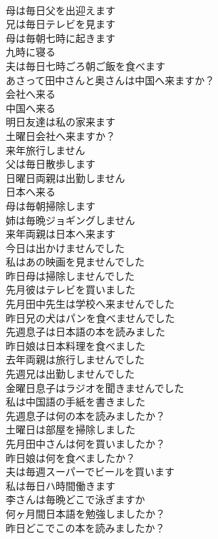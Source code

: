 \documentclass[8pt]{extreport}
\begin{document}
\begin{CJK}{UTF8}{min}
\\	母は毎日父を出迎えます	
\\	兄は毎日テレビを見ます	
\\	母は毎朝七時に起きます	
\\	九時に寝る	
\\	夫は毎日七時ごろ朝ご飯を食べます	
\\	あさって田中さんと奥さんは中国へ来ますか？	
\\	会社へ来る	
\\	中国へ来る	
\\	明日友達は私の家来ます	
\\	土曜日会社へ来ますか？	
\\	来年旅行しません	
\\	父は毎日散歩します	
\\	日曜日両親は出勤しません	
\\	日本へ来る	
\\	母は毎朝掃除します	
\\	姉は毎晩ジョギングしません	
\\	来年両親は日本へ来ます	
\\	今日は出かけませんでした	
\\	私はあの映画を見ませんでした	
\\	昨日母は掃除しませんでした	
\\	先月彼はテレビを買いました	
\\	先月田中先生は学校へ来ませんでした	
\\	昨日兄の犬はパンを食べませんでした	
\\	先週息子は日本語の本を読みました	
\\	昨日娘は日本料理を食べました	
\\	去年両親は旅行しませんでした	
\\	先週兄は出勤しませんでした	
\\	金曜日息子はラジオを聞きませんでした	
\\	私は中国語の手紙を書きました	
\\	先週息子は何の本を読みましたか？	
\\	土曜日は部屋を掃除しました	
\\	先月田中さんは何を買いましたか？	
\\	昨日娘は何を食べましたか？	
\\	夫は毎週スーパーでビールを買います	
\\	私は毎日ハ時間働きます	
\\	李さんは毎晩どこで泳ぎますか	
\\	何ヶ月間日本語を勉強しましたか？	
\\	昨日どこでこの本を読みましたか？	

\end{CJK}
\end{document}
